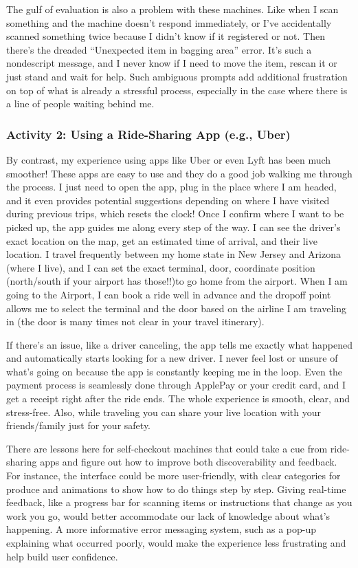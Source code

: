 \documentclass[
	letterpaper, %
]{jdf}
\begin{document}
The gulf of evaluation is also a problem with these machines.  Like when I scan something and the machine doesn’t respond immediately, or I’ve accidentally scanned something twice because I didn’t know if it registered or not. Then there’s the dreaded “Unexpected item in bagging area” error. It’s such a nondescript message, and I never know if I need to move the item, rescan it or just stand and wait for help. Such ambiguous prompts add additional frustration on top of what is already a stressful process, especially in the case where there is a line of people waiting behind me.

\subsubsection {Activity 2: Using a Ride-Sharing App (e.g., Uber)}
By contrast, my experience using apps like Uber or even Lyft has been much smoother! These apps are easy to use and they do a good job walking me through the process. I just need to open the app, plug in the place where I am headed, and it even provides potential suggestions depending on where I have visited during previous trips, which resets the clock! Once I confirm where I want to be picked up, the app guides me along every step of the way. I can see the driver’s exact location on the map, get an estimated time of arrival, and their live location. I travel frequently between my home state in New Jersey and Arizona (where I live), and I can set the exact terminal, door, coordinate position (north/south if your airport has those!!)to go home from the airport. When I am going to the Airport, I can book a ride well in advance and the dropoff point allows me to select the terminal and the door based on the airline I am traveling in (the door is many times not clear in your travel itinerary).

If there’s an issue, like a driver canceling, the app tells me exactly what happened and automatically starts looking for a new driver. I never feel lost or unsure of what’s going on because the app is constantly keeping me in the loop. Even the payment process is seamlessly done through ApplePay or your credit card, and I get a receipt right after the ride ends. The whole experience is smooth, clear, and stress-free. Also, while traveling you can share your live location with your friends/family just for your safety. 

There are lessons here for self-checkout machines that could take a cue from ride-sharing apps and figure out how to improve both discoverability and feedback. For instance, the interface could be more user-friendly, with clear categories for produce and animations to show how to do things step by step. Giving real-time feedback, like a progress bar for scanning items or instructions that change as you work you go, would better accommodate our lack of knowledge about what’s happening. A more informative error messaging system, such as a pop-up explaining what occurred poorly, would make the experience less frustrating and help build user confidence.
\newpage
\end{document}

